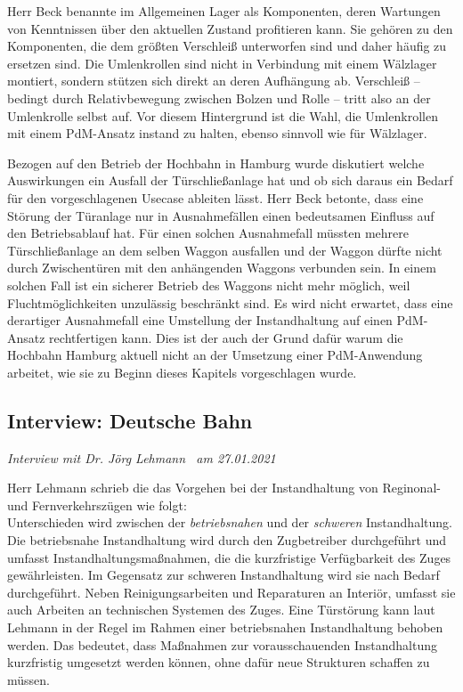 Herr Beck benannte im Allgemeinen Lager als Komponenten, deren Wartungen von Kenntnissen über den aktuellen Zustand profitieren kann. Sie gehören zu den Komponenten, die dem größten Verschleiß unterworfen sind und daher häufig zu ersetzen sind. Die Umlenkrollen sind nicht in Verbindung mit einem Wälzlager montiert, sondern stützen sich direkt an deren Aufhängung ab. Verschleiß -- bedingt durch Relativbewegung zwischen Bolzen und Rolle -- tritt also an der Umlenkrolle selbst auf. Vor diesem Hintergrund ist die Wahl, die Umlenkrollen mit einem PdM-Ansatz instand zu halten, ebenso sinnvoll wie für Wälzlager.

Bezogen auf den Betrieb der Hochbahn in Hamburg wurde diskutiert welche Auswirkungen ein Ausfall der Türschließanlage hat und ob sich daraus ein Bedarf für den vorgeschlagenen Usecase ableiten lässt. Herr Beck betonte, dass eine Störung der Türanlage nur in Ausnahmefällen einen bedeutsamen Einfluss auf den Betriebsablauf hat. Für einen solchen Ausnahmefall müssten mehrere Türschließanlage an dem selben Waggon ausfallen und der Waggon dürfte nicht durch Zwischentüren mit den anhängenden Waggons verbunden sein. In einem solchen Fall ist ein sicherer Betrieb des Waggons nicht mehr möglich, weil Fluchtmöglichkeiten unzulässig beschränkt sind. Es wird nicht erwartet, dass eine derartiger Ausnahmefall eine Umstellung der Instandhaltung auf einen PdM-Ansatz rechtfertigen kann. Dies ist der auch der Grund dafür warum die Hochbahn Hamburg aktuell nicht an der Umsetzung einer PdM-Anwendung arbeitet, wie sie zu Beginn dieses Kapitels vorgeschlagen wurde.
\subsection{Interview: Deutsche Bahn}
\label{subsec:interview_deutsche_bahn}
\textit{Interview mit Dr. Jörg Lehmann~\cite{db.27.01.2021} am {27.01.2021}}

Herr Lehmann schrieb die das Vorgehen bei der Instandhaltung von Reginonal- und Fernverkehrszügen wie folgt:\\
Unterschieden wird zwischen der \textit{betriebsnahen} und der \textit{schweren} Instandhaltung. Die betriebsnahe Instandhaltung wird durch den Zugbetreiber durchgeführt und umfasst Instandhaltungsmaßnahmen, die die kurzfristige Verfügbarkeit des Zuges gewährleisten. Im Gegensatz zur schweren Instandhaltung wird sie nach Bedarf durchgeführt. Neben Reinigungsarbeiten und Reparaturen an Interiör, umfasst sie auch Arbeiten an technischen Systemen des Zuges. Eine Türstörung kann laut Lehmann in der Regel im Rahmen einer betriebsnahen Instandhaltung behoben werden. Das bedeutet, dass Maßnahmen zur vorausschauenden Instandhaltung kurzfristig umgesetzt werden können, ohne dafür neue Strukturen schaffen zu müssen.

